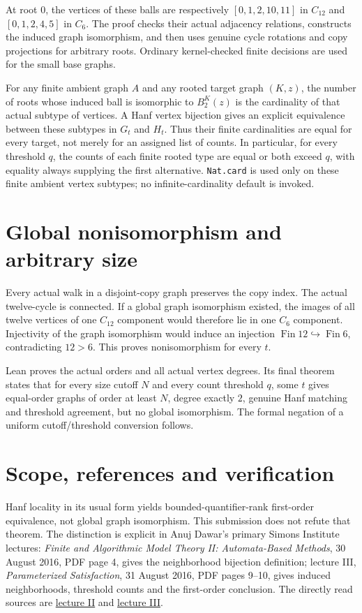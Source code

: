 \documentclass[11pt]{article}
\begin{document}
At root $0$, the vertices of these balls are respectively
$[0,1,2,10,11]$ in $C_{12}$ and $[0,1,2,4,5]$ in $C_6$.
The proof checks their actual adjacency relations, constructs the
induced graph isomorphism, and then uses genuine cycle rotations
and copy projections for arbitrary roots. Ordinary kernel-checked
finite decisions are used for the small base graphs.

\newpage
For any finite ambient graph $A$ and any rooted target graph
$(K,z)$, the number of roots whose induced ball is isomorphic
to $B_2^K(z)$ is the cardinality of that actual subtype of vertices.
A Hanf vertex bijection gives an explicit equivalence between
these subtypes in $G_t$ and $H_t$. Thus their finite cardinalities
are equal for every target, not merely for an assigned list of
counts. In particular, for every threshold $q$, the counts of
each finite rooted type are equal or both exceed $q$, with equality
always supplying the first alternative. \texttt{Nat.card} is used
only on these finite ambient vertex subtypes; no infinite-cardinality
default is invoked.

\section{Global nonisomorphism and arbitrary size}
Every actual walk in a disjoint-copy graph preserves the copy
index. The actual twelve-cycle is connected. If a global graph
isomorphism existed, the images of all twelve vertices of one
$C_{12}$ component would therefore lie in one $C_6$ component.
Injectivity of the graph isomorphism would induce an injection
$\operatorname{Fin}12\hookrightarrow\operatorname{Fin}6$, contradicting
$12>6$. This proves nonisomorphism for every $t$.

Lean proves the actual orders and all actual vertex degrees.
Its final theorem states that for every size cutoff $N$ and
every count threshold $q$, some $t$ gives equal-order graphs of
order at least $N$, degree exactly $2$, genuine Hanf matching
and threshold agreement, but no global isomorphism. The formal
negation of a uniform cutoff/threshold conversion follows.

\section{Scope, references and verification}
Hanf locality in its usual form yields bounded-quantifier-rank
first-order equivalence, not global graph isomorphism. This
submission does not refute that theorem. The distinction is
explicit in Anuj Dawar's primary Simons Institute lectures:
\emph{Finite and Algorithmic Model Theory II: Automata-Based
Methods}, 30 August 2016, PDF page 4, gives the neighborhood
bijection definition; lecture III, \emph{Parameterized
Satisfaction}, 31 August 2016, PDF pages 9--10, gives induced
neighborhoods, threshold counts and the first-order conclusion.
The directly read sources are
\href{https://simons.berkeley.edu/sites/default/files/docs/5233/lecture22.pdf}{lecture II}
and
\href{https://simons.berkeley.edu/sites/default/files/docs/5234/lecture31.pdf}{lecture III}.
\end{document}
